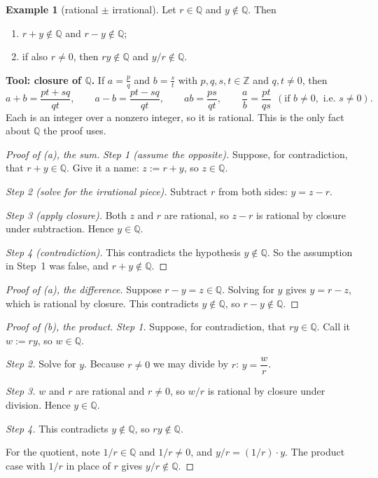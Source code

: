 \documentclass[11pt]{article}
\theoremstyle{definition}
\newtheorem{ex}[defn]{Example}
\newcommand{\Z}{\mathbb{Z}}
\newcommand{\Q}{\mathbb{Q}}
\newcommand{\key}[1]{\textcolor{red!70!black}{\textbf{#1}}}
\begin{document}
\begin{ex}[rational $\pm$ irrational]
Let $r\in\Q$ and $y\notin\Q$. Then
\begin{enumerate}[nosep, label=(\alph*)]
  \item $r+y\notin\Q$ and $r-y\notin\Q$;
  \item if also $r\ne0$, then $ry\notin\Q$ and $y/r\notin\Q$.
\end{enumerate}

\noindent\key{Tool: closure of $\Q$.} If $a=\frac pq$ and $b=\frac st$ with
$p,q,s,t\in\Z$ and $q,t\ne0$, then
\[
a+b=\frac{pt+sq}{qt},\qquad a-b=\frac{pt-sq}{qt},\qquad
ab=\frac{ps}{qt},\qquad \frac ab=\frac{pt}{qs}\ \ (\text{if } b\ne0,\text{ i.e.\ } s\ne0).
\]
Each is an integer over a nonzero integer, so it is rational. This is the
only fact about $\Q$ the proof uses.

\begin{proof}[Proof of (a), the sum]
\emph{Step 1 (assume the opposite).} Suppose, for contradiction, that
$r+y\in\Q$. Give it a name: $z:=r+y$, so $z\in\Q$.

\emph{Step 2 (solve for the irrational piece).} Subtract $r$ from both
sides: $y=z-r$.

\emph{Step 3 (apply closure).} Both $z$ and $r$ are rational, so $z-r$ is
rational by closure under subtraction. Hence $y\in\Q$.

\emph{Step 4 (contradiction).} This contradicts the hypothesis
$y\notin\Q$. So the assumption in Step~1 was false, and $r+y\notin\Q$.
\end{proof}

\begin{proof}[Proof of (a), the difference]
Suppose $r-y=z\in\Q$. Solving for $y$ gives $y=r-z$, which is rational
by closure. This contradicts $y\notin\Q$, so $r-y\notin\Q$.
\end{proof}

\begin{proof}[Proof of (b), the product]
\emph{Step 1.} Suppose, for contradiction, that $ry\in\Q$. Call it
$w:=ry$, so $w\in\Q$.

\emph{Step 2.} Solve for $y$. Because $r\ne0$ we may divide by $r$:
$y=\dfrac wr$.

\emph{Step 3.} $w$ and $r$ are rational and $r\ne0$, so $w/r$ is rational
by closure under division. Hence $y\in\Q$.

\emph{Step 4.} This contradicts $y\notin\Q$, so $ry\notin\Q$.

For the quotient, note $1/r\in\Q$ and $1/r\ne0$, and $y/r=(1/r)\cdot y$.
The product case with $1/r$ in place of $r$ gives $y/r\notin\Q$.
\end{proof}


\end{ex}
\end{document}
